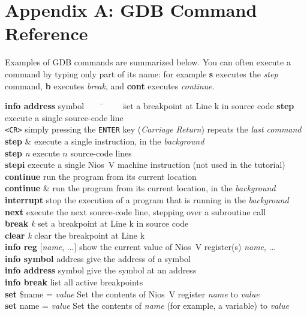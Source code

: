 \documentclass[11pt, twoside, pdftex]{article}
\begin{document}
\newpage
\section*{Appendix A: GDB Command Reference}

Examples of GDB commands are summarized below. You can often execute a command by typing
only part of its name: for example {\bf s} executes the {\it step} command, {\bf b} executes
{\it break}, and {\bf cont} executes {\it continue}.

\begin{tabbing}
{\bf info address} symbol ~~~~\= ~~~~\=set a breakpoint at Line k in source code\kill
{\bf step} \>execute a single source-code line\\
{\texttt{<CR>}} \>simply pressing the \texttt{ENTER} key ({\it Carriage Return}) repeats the {\it last command}\\
{\bf step} \& \>execute a single instruction, in the {\it background}\\
{\bf step} {\it n} \>execute $n$ source-code lines\\
{\bf stepi} \>execute a single Nios~V machine instruction (not used in the tutorial)\\
{\bf continue} \>run the program from its current location\\
{\bf continue} \& \>run the program from its current location, in the {\it background}\\
{\bf interrupt} \>stop the execution of a program that is running in the {\it background}\\
{\bf next} \>execute the next source-code line, stepping over a subroutine call\\
{\bf break} {\it k} \>set a breakpoint at Line k in source code\\
{\bf clear} {\it k} \>clear the breakpoint at Line k \\
{\bf info reg} [{\it name}, $\ldots$] \>show the current value of Nios~V register(s) {\it
name}, $\ldots$\\
{\bf info symbol} address \>give the address of a symbol\\
{\bf info address} symbol \>give the symbol at an address\\
{\bf info break} \>list all active breakpoints\\
{\bf set} \$name = {\it value} \>Set the contents of Nios~V register {\it name} to {\it value}\\
{\bf set} name = {\it value} \>Set the contents of {\it name} (for example, a variable) to {\it value}\\

\end{tabbing}
\end{document}
